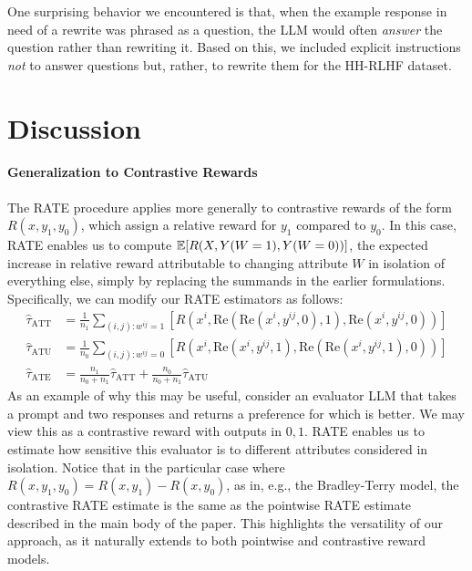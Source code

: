 \documentclass{article}
\begin{document}
One surprising behavior we encountered is that, when the example response in need of a rewrite was phrased as a question, the LLM would often \emph{answer} the question rather than rewriting it. Based on this, we included explicit instructions \emph{not} to answer questions but, rather, to rewrite them for the HH-RLHF dataset.

\section{Discussion}
\label{sec:discussion}

\paragraph{Generalization to Contrastive Rewards}
The RATE procedure applies more generally to contrastive rewards of the form $R(x, y_1, y_0)$, which assign a relative reward for $y_1$ compared to $y_0$. In this case, RATE enables us to compute $\mathbb{E}[R(X, Y(W=1), Y(W=0))]$, the expected increase in relative reward attributable to changing attribute $W$ in isolation of everything else, simply by replacing the summands in the earlier formulations. Specifically, we can modify our RATE estimators as follows:
\begin{align*}
  \hat{\tau}_{\text{ATT}} &= \frac{1}{n_1} \sum_{(i, j): w^{ij} = 1} [R(x^i, \text{Re}(\text{Re}(x^i, y^{ij}, 0), 1), \text{Re}(x^i, y^{ij}, 0))] \\
  \hat{\tau}_{\text{ATU}} &= \frac{1}{n_0} \sum_{(i,j): w^{ij} = 0} [R(x^i, \text{Re}(x^i, y^{ij}, 1), \text{Re}(\text{Re}(x^i, y^{ij}, 1), 0))] \\
  \hat{\tau}_{\text{ATE}} &= \frac{n_1}{n_0 + n_1} \hat{\tau}_{\text{ATT}} + \frac{n_0}{n_0 + n_1} \hat{\tau}_{\text{ATU}}
\end{align*}
As an example of why this may be useful, consider an evaluator LLM that takes a prompt and two responses and returns a preference for which is better. We may view this as a contrastive reward with outputs in ${0,1}$. RATE enables us to estimate how sensitive this evaluator is to different attributes considered in isolation. Notice that in the particular case where $R(x, y_1, y_0) = R(x, y_1) - R(x, y_0)$, as in, e.g., the Bradley-Terry model, the contrastive RATE estimate is the same as the pointwise RATE estimate described in the main body of the paper. This highlights the versatility of our approach, as it naturally extends to both pointwise and contrastive reward models.
\end{document}
